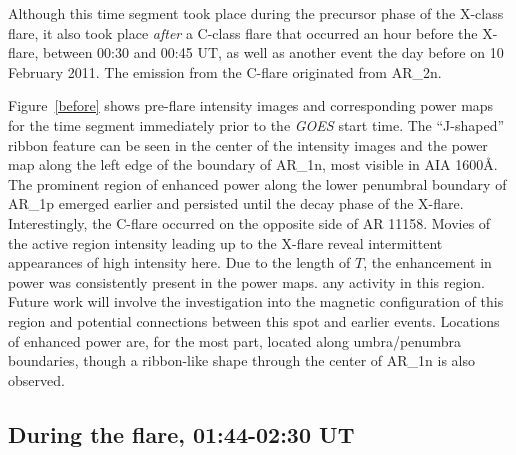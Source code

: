 
Although this time segment took place during the precursor phase
of the X-class flare, it also took place
\emph{after} a C-class flare that occurred an hour before the X-flare,
between 00:30 and 00:45 UT,
as well as another event the day before on 10 February 2011.
The emission from the C-flare originated from AR\_2n.

Figure~\ref{before}
shows pre-flare intensity images and corresponding power maps for
the time segment immediately prior to the \textit{GOES}
start time.
The ``J-shaped'' ribbon feature can be seen in the center of the
intensity images and the power map
along the left
edge of the boundary of AR\_1n,
most visible in AIA 1600\AA{}.
The prominent region of enhanced power along the lower penumbral
boundary of AR\_1p
emerged earlier and persisted until the decay phase of the X-flare.
Interestingly, the C-flare occurred on the opposite side of
AR 11158.
Movies of the active region intensity leading up to the X-flare reveal
intermittent appearances of high intensity here. Due to the length
of $T$, the enhancement in power was consistently present in the power maps.
any activity in this region.
Future work will involve the investigation into
the magnetic configuration of this region and
potential connections between this spot and earlier events.
Locations of enhanced power are, for the most part, located along
umbra/penumbra boundaries, though a ribbon-like shape through the
center of AR\_1n is also observed.


\clearpage
\subsection{During the flare, 01:44-02:30 UT}



